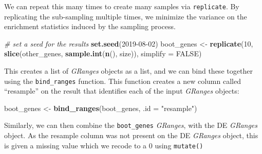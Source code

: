 \documentclass[
]{article}
\newenvironment{Shaded}{}{}
\newcommand{\CommentTok}[1]{\textcolor[rgb]{0.38,0.63,0.69}{\textit{#1}}}
\newcommand{\DataTypeTok}[1]{\textcolor[rgb]{0.56,0.13,0.00}{#1}}
\newcommand{\DecValTok}[1]{\textcolor[rgb]{0.25,0.63,0.44}{#1}}
\newcommand{\KeywordTok}[1]{\textcolor[rgb]{0.00,0.44,0.13}{\textbf{#1}}}
\newcommand{\NormalTok}[1]{#1}
\newcommand{\OperatorTok}[1]{\textcolor[rgb]{0.40,0.40,0.40}{#1}}
\newcommand{\OtherTok}[1]{\textcolor[rgb]{0.00,0.44,0.13}{#1}}
\newcommand{\StringTok}[1]{\textcolor[rgb]{0.25,0.44,0.63}{#1}}
\begin{document}
We can repeat this many times to create many samples via \texttt{replicate}. By
replicating the sub-sampling multiple times, we minimize the variance on the
enrichment statistics induced by the sampling process.

\begin{Shaded}
\begin{Highlighting}[]
\CommentTok{# set a seed for the results}
\KeywordTok{set.seed}\NormalTok{(}\DecValTok{2019-08-02}\NormalTok{)}
\NormalTok{boot_genes <-}\StringTok{ }\KeywordTok{replicate}\NormalTok{(}\DecValTok{10}\NormalTok{,}
                        \KeywordTok{slice}\NormalTok{(other_genes, }\KeywordTok{sample.int}\NormalTok{(}\KeywordTok{n}\NormalTok{(), size)),}
                        \DataTypeTok{simplify =} \OtherTok{FALSE}\NormalTok{)}
\end{Highlighting}
\end{Shaded}

This creates a list of \emph{GRanges} objects as a list, and we can bind these together
using the \texttt{bind\_ranges} function. This function creates a new column called
``resample'' on the result that identifies each of the input \emph{GRanges} objects:

\begin{Shaded}
\begin{Highlighting}[]
\NormalTok{boot_genes <-}\StringTok{ }\KeywordTok{bind_ranges}\NormalTok{(boot_genes, }\DataTypeTok{.id =} \StringTok{"resample"}\NormalTok{)}
\end{Highlighting}
\end{Shaded}

Similarly, we can then combine the \texttt{boot\_genes} \emph{GRanges}, with the DE
\emph{GRanges} object. As the resample column was not present on the DE \emph{GRanges}
object, this is given a missing value which we recode to a 0 using \texttt{mutate()}

\begin{Shaded}
\end{Shaded}
\end{document}
